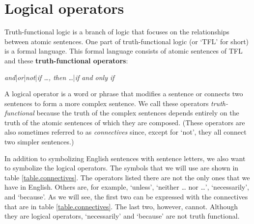 


\chapter{Logical operators}
\label{s:TFLConnectives}

{Truth-functional logic} is a branch of logic that focuses on the relationships between atomic sentences. One part of truth-functional logic (or `TFL' for short) is a formal language. This formal language consists of atomic sentences of TFL and these \textbf{truth-functional operators}: 

\centerline{\textit{and}\quad|\quad \textit{or}\quad|\quad \textit{not}\quad|\quad \textit{if \ldots, then \ldots}\quad|\quad \textit{if and only if}}



\noindent A logical operator is a word or phrase that modifies a sentence or connects two sentences to form a more complex sentence. We call these operators \textit{truth-functional} because the truth of the complex sentences depends entirely on the truth of the atomic sentences of which they are composed. (These operators are also sometimes referred to as \textit{connectives} since, except for `not', they all connect two simpler sentences.)  

In addition to symbolizing English sentences with sentence letters, we also want to symbolize the logical operators. The symbols that we will use are shown in table \ref{table.connectives}. The operators listed there are not the only ones that we have in English. Others are, for example, `unless', `neither \dots{} nor \dots', `necessarily', and `because'. As we will see, the first two can be expressed with the connectives that are in table \ref{table.connectives}. The last two, however, cannot. Although they are logical operators, `necessarily' and `because' are not truth functional.


